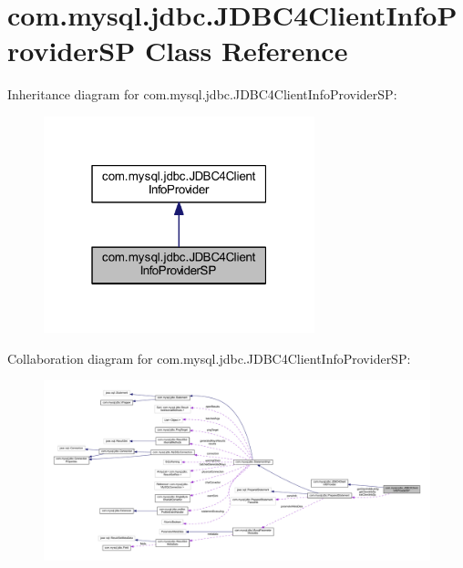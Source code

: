 \hypertarget{classcom_1_1mysql_1_1jdbc_1_1_j_d_b_c4_client_info_provider_s_p}{}\section{com.\+mysql.\+jdbc.\+J\+D\+B\+C4\+Client\+Info\+Provider\+SP Class Reference}
\label{classcom_1_1mysql_1_1jdbc_1_1_j_d_b_c4_client_info_provider_s_p}


Inheritance diagram for com.\+mysql.\+jdbc.\+J\+D\+B\+C4\+Client\+Info\+Provider\+SP\+:
\nopagebreak
\begin{figure}[H]
\begin{center}
\leavevmode
\includegraphics[width=223pt]{classcom_1_1mysql_1_1jdbc_1_1_j_d_b_c4_client_info_provider_s_p__inherit__graph}
\end{center}
\end{figure}


Collaboration diagram for com.\+mysql.\+jdbc.\+J\+D\+B\+C4\+Client\+Info\+Provider\+SP\+:
\nopagebreak
\begin{figure}[H]
\begin{center}
\leavevmode
\includegraphics[width=350pt]{classcom_1_1mysql_1_1jdbc_1_1_j_d_b_c4_client_info_provider_s_p__coll__graph}
\end{center}
\end{figure}
